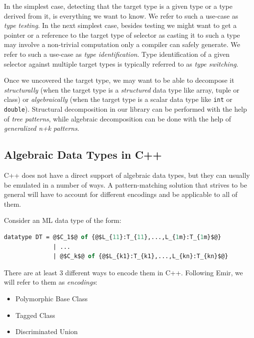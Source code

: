 \documentclass[preprint]{sigplanconf}
\makeatletter
\DeclareRobustCommand{\code}[1]{{\lstinline[breaklines=false,escapechar=@]{#1}}}
\makeatother
\begin{document}
In the simplest case, detecting that the target type is a given type or a type 
derived from it, is everything we want to know. We refer to such a use-case as 
\emph{type testing}. In the next simplest case, besides testing we might want to 
get a pointer or a reference to the target type of selector as casting it to such 
a type may involve a non-trivial computation only a compiler can safely 
generate. We refer to such a use-case as \emph{type identification}. Type 
identification of a given selector against multiple target types is typically 
referred to as \emph{type switching}.

Once we uncovered the target type, we may want to be able to decompose it 
\emph{structurally} (when the target type is a \emph{structured} data type like 
array, tuple or class) or \emph{algebraically} (when the target type is a scalar 
data type like \code{int} or \code{double}). Structural decomposition in our 
library can be performed with the help of \emph{tree patterns}, while algebraic 
decomposition can be done with the help of \emph{generalized n+k patterns}.

\subsection{Algebraic Data Types in C++}
\label{sec:adt}

C++ does not have a direct support of algebraic data types, but they can usually 
be emulated in a number of ways. A pattern-matching solution that strives to be 
general will have to account for different encodings and be applicable to all of 
them.

Consider an ML data type of the form:

\begin{lstlisting}[language=ML,keepspaces,columns=flexible,escapechar=@]
datatype DT = @$C_1$@ of {@$L_{11}:T_{11},...,L_{1m}:T_{1m}$@} 
              | ...
              | @$C_k$@ of {@$L_{k1}:T_{k1},...,L_{kn}:T_{kn}$@}
\end{lstlisting}

\noindent There are at least 3 different ways to encode them in C++. Following 
Emir, we will refer to them as \emph{encodings}:

\begin{itemize}
\item Polymorphic Base Class
\item Tagged Class
\item Discriminated Union
\end{itemize}
\end{document}
